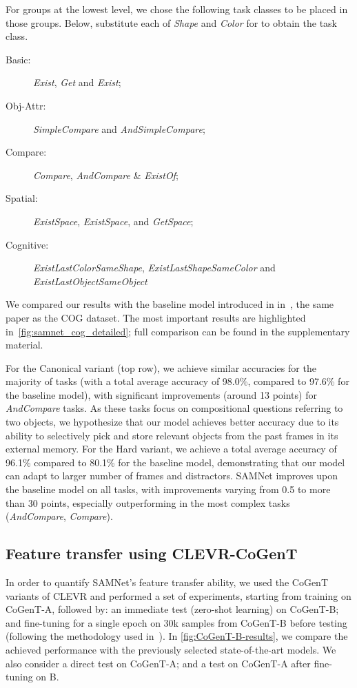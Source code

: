 For groups at the lowest level, we chose the following task classes to be placed in those groups.
Below, substitute each of \textit{Shape} and \textit{Color} for  \uX{} to obtain the task class.
\begin{description}
	\item[Basic:] \textit{Exist}\uX, \textit{Get}\uX{} and \textit{Exist};
	\item[Obj-Attr:] \emph{SimpleCompare}\uX{} and \textit{AndSimpleCompare}\uX;
	\item[Compare:] \textit{Compare}\uX,  \textit{AndCompare}\uX{} \& \textit{Exist}\uX\textit{Of};
	\item[Spatial:] \textit{ExistSpace}, \textit{Exist}\uX\textit{Space}, and \textit{Get}\uX\textit{Space};
	\item[Cognitive:] \textit{ExistLastColorSameShape}, \textit{ExistLastShapeSameColor} and \textit{ExistLastObjectSameObject}
\end{description}


We compared our results with the baseline model introduced in in~\cite{yang2018dataset}, the same paper as the COG dataset.
The most important results are highlighted in~\cref{fig:samnet_cog_detailed}; full comparison can be found in the supplementary material.

For the Canonical variant (top row), we achieve similar accuracies for the majority of tasks (with a total average accuracy of 98.0\%, compared to 97.6\% for the baseline model), with significant improvements (around 13 points) for \textit{AndCompare} tasks.
As these tasks focus on compositional questions referring to two objects, we hypothesize that our model achieves better accuracy due to its ability to selectively pick and store relevant objects from the past frames in its external memory.
For the Hard variant, we achieve a total average accuracy of 96.1\% compared to 80.1\% for the baseline model, demonstrating that our model can adapt to larger number of frames and distractors.
SAMNet improves upon the baseline model on all tasks, with improvements varying from 0.5 to more than 30 points, especially outperforming in the most complex tasks (\textit{AndCompare}\uX, \textit{Compare}\uX).


\subsection{Feature transfer using CLEVR-CoGenT}
\label{sec:feature}

In order to quantify SAMNet's feature transfer ability, we used the CoGenT variants of CLEVR and performed a set of experiments, starting from training on CoGenT-A, followed by:
an immediate test (zero-shot learning) on CoGenT-B; and fine-tuning for a single epoch on 30k samples from CoGenT-B before testing (following the methodology used in~\cite{johnson2017inferring,mascharka2018transparency,perez2018film,marois2018transfer}).
In \cref{fig:CoGenT-B-results}, we compare the achieved performance with the previously selected state-of-the-art models.
We also consider a direct test on CoGenT-A; and a test on CoGenT-A after fine-tuning on B.

